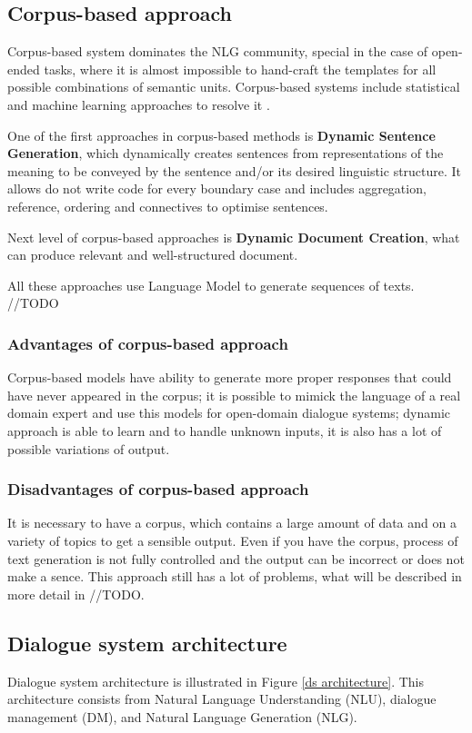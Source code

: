 \subsection{Corpus-based approach}
Corpus-based system dominates the NLG community, special in the case of open-ended tasks, where it is almost impossible to hand-craft the templates for all possible combinations of semantic units. Corpus-based systems include statistical and machine learning approaches to resolve it \cite{rudnicky2002dialog}.

One of the first approaches in corpus-based methods is \textbf{Dynamic Sentence Generation}, which dynamically creates sentences from representations of the meaning to be conveyed by the sentence and/or its desired linguistic structure. It allows do not write code for every boundary case and includes aggregation, reference, ordering and connectives to optimise sentences.

Next level of corpus-based approaches is \textbf{Dynamic Document Creation}, what can produce relevant and well-structured document. 

All these approaches use Language Model to generate sequences of texts. //TODO

\subsubsection{Advantages of corpus-based approach}
Corpus-based models have ability to generate more proper responses that could have never appeared in the corpus; it is possible to mimick the language of a real domain expert and use this models for open-domain dialogue systems; dynamic approach is able to learn and to handle unknown inputs, it is also has a lot of possible variations of output.

\subsubsection{Disadvantages of corpus-based approach}
It is necessary to have a corpus, which contains a large amount of data and on a variety of topics to get a sensible output. Even if you have the corpus, process of text generation is not fully controlled and the output can be incorrect or does not make a sence. This approach still has a lot of problems, what will be described in more detail in //TODO. 


\subsection{Dialogue system architecture} 
Dialogue system architecture is illustrated in Figure \ref{ds architecture}. This architecture consists from Natural Language Understanding (NLU), dialogue management (DM), and Natural Language Generation (NLG).

